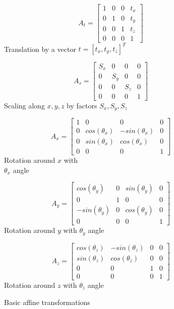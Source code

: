 \begin{figure}[H]  

  \begin{minipage}{.3\linewidth}
    \centering
    \[A_t=\left[\begin{array}{cccc}
      1 & 0 & 0 & t_x \\
      0 & 1 & 0 & t_y \\
      0 & 0 & 1 & t_z \\
      0 & 0 & 0 & 1
    \end{array}\right]\]
    Translation by a vector $t=[t_x,t_y,t_z]^T$
  \end{minipage}%
  \begin{minipage}{.3\linewidth}
    \centering
    \[A_s=\left[\begin{array}{cccc}
      S_x & 0 & 0 & 0 \\
      0 & S_y & 0 & 0 \\
      0 & 0 & S_z & 0 \\
      0 & 0 & 0 & 1
    \end{array}\right]\]
    Scaling along $x,y,z$ by factors $S_x,S_y,S_z$
  \end{minipage}  
  \begin{minipage}{.4\linewidth}
    \centering
    \[A_x=\left[\begin{array}{cccc}
      1 & 0 & 0 & 0 \\
      0 & cos(\theta_x) & -sin(\theta_x) & 0 \\
      0 & sin(\theta_x) & cos(\theta_x) & 0 \\
      0 & 0 & 0 & 1
    \end{array}\right]\]
    Rotation around $x$ with \\ $\theta_x$ angle
  \end{minipage}%
  
  \begin{minipage}{.5\linewidth}
    \centering
    \[A_y=\left[\begin{array}{cccc}
      cos(\theta_y) & 0 & sin(\theta_y) & 0 \\
      0 & 1 & 0 & 0 \\
      -sin(\theta_y) & 0 & cos(\theta_y) & 0 \\
      0 & 0 & 0 & 1
    \end{array}\right]\]
    Rotation around $y$ with $\theta_y$ angle 
  \end{minipage}
  \begin{minipage}{.5\linewidth}
    \centering
    \[A_z=\left[\begin{array}{cccc}
      cos(\theta_z) & -sin(\theta_z) & 0 & 0 \\
      sin(\theta_z) & cos(\theta_z) & 0 & 0 \\
      0 & 0 & 1 & 0 \\
      0 & 0 & 0 & 1
    \end{array}\right]\]
    Rotation around $z$ with $\theta_z$ angle 
  \end{minipage}
  
  
  \caption{Basic affine transformations}
  \label{fig:transformations}
\end{figure}

